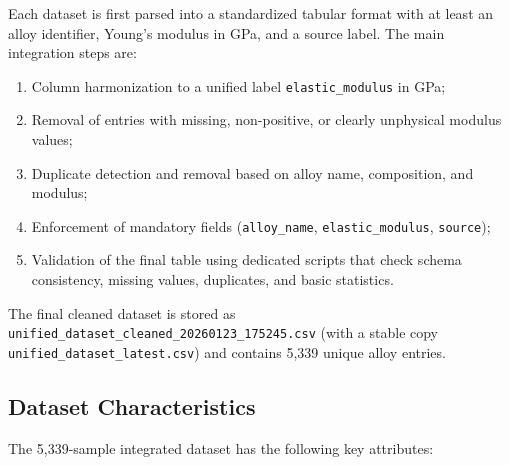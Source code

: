 \documentclass[11pt,a4paper]{article}
\begin{document}
Each dataset is first parsed into a standardized tabular format with at least an alloy identifier, Young's modulus in GPa, and a source label. The main integration steps are:

\begin{enumerate}
  \item Column harmonization to a unified label \texttt{elastic\_modulus} in GPa;
  \item Removal of entries with missing, non-positive, or clearly unphysical modulus values;
  \item Duplicate detection and removal based on alloy name, composition, and modulus;
  \item Enforcement of mandatory fields (\texttt{alloy\_name}, \texttt{elastic\_modulus}, \texttt{source});
  \item Validation of the final table using dedicated scripts that check schema consistency, missing values, duplicates, and basic statistics.
\end{enumerate}

The final cleaned dataset is stored as \texttt{unified\_dataset\_cleaned\_20260123\_175245.csv} (with a stable copy \texttt{unified\_dataset\_latest.csv}) and contains 5{,}339 unique alloy entries.

\subsection{Dataset Characteristics}

The 5{,}339-sample integrated dataset has the following key attributes:
\end{document}
